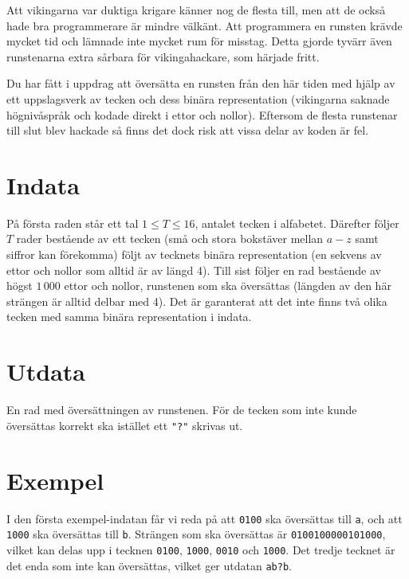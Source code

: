 Att vikingarna var duktiga krigare känner nog de flesta till, men att de också hade bra programmerare är mindre välkänt. Att programmera en runsten krävde mycket tid och lämnade inte mycket rum för misstag. Detta gjorde tyvärr även runstenarna extra sårbara för vikingahackare, som härjade fritt.

Du har fått i uppdrag att översätta en runsten från den här tiden med hjälp av ett uppslagsverk av tecken och dess binära representation (vikingarna saknade högnivåspråk och kodade direkt i ettor och nollor). Eftersom de flesta runstenar till slut blev hackade så finns det dock risk att vissa delar av koden är fel.

\section*{Indata}
På första raden står ett tal $1 \le T \le 16$, antalet tecken i alfabetet. Därefter följer $T$ rader bestående av ett tecken (små och stora bokstäver mellan $a-z$ samt siffror kan förekomma) följt av tecknets binära representation (en sekvens av ettor och nollor som alltid är av längd 4). Till sist följer en rad bestående av högst $1\,000$ ettor och nollor, runstenen som ska översättas (längden av den här strängen är alltid delbar med 4). Det är garanterat att det inte finns två olika tecken med samma binära representation i indata.

\section*{Utdata}
En rad med översättningen av runstenen. För de tecken som inte kunde översättas korrekt ska istället ett \texttt{"?"} skrivas ut.

\section*{Exempel}
I den första exempel-indatan får vi reda på att \texttt{0100} ska översättas till \texttt{a}, och att \texttt{1000} ska översättas till \texttt{b}. Strängen som ska översättas är \texttt{0100100000101000}, vilket kan delas upp i tecknen \texttt{0100}, \texttt{1000}, \texttt{0010} och \texttt{1000}. Det tredje tecknet är det enda som inte kan översättas, vilket ger utdatan \texttt{ab?b}.
